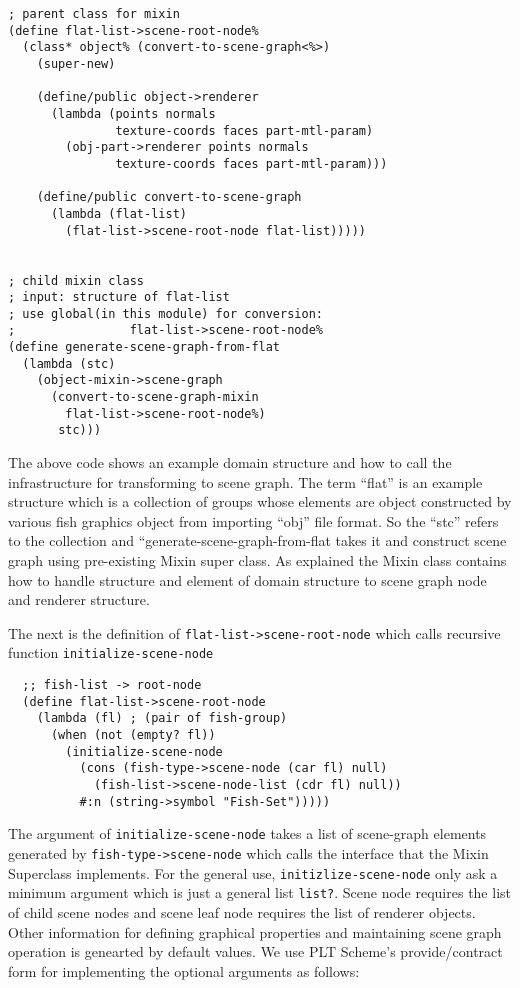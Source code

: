 \documentclass[preprint,nocopyrightspace]{sigplanconf}
\begin{document}
\begin{verbatim}
; parent class for mixin
(define flat-list->scene-root-node%
  (class* object% (convert-to-scene-graph<%>)
    (super-new)
    
    (define/public object->renderer 
      (lambda (points normals 
               texture-coords faces part-mtl-param)
        (obj-part->renderer points normals 
               texture-coords faces part-mtl-param)))
    
    (define/public convert-to-scene-graph 
      (lambda (flat-list)
        (flat-list->scene-root-node flat-list)))))
   

; child mixin class
; input: structure of flat-list
; use global(in this module) for conversion: 
;                flat-list->scene-root-node%
(define generate-scene-graph-from-flat
  (lambda (stc)
    (object-mixin->scene-graph 
      (convert-to-scene-graph-mixin 
        flat-list->scene-root-node%)
       stc)))
\end{verbatim}

The above code shows an example domain structure and how to call the infrastructure for transforming to scene graph. 
The term ``flat'' is an example structure which is a collection of groups whose elements are object constructed by various fish graphics object from importing ``obj'' file format. So the ``stc'' refers to the collection and ``generate-scene-graph-from-flat takes it and construct scene graph using pre-existing Mixin super class. As explained the Mixin class contains how to handle structure and element of domain structure to scene graph node and renderer structure. 

The next is the definition of {\tt flat-list->scene-root-node} which calls recursive function {\tt initialize-scene-node} 
\begin{verbatim}
  ;; fish-list -> root-node
  (define flat-list->scene-root-node
    (lambda (fl) ; (pair of fish-group)
      (when (not (empty? fl))
        (initialize-scene-node
          (cons (fish-type->scene-node (car fl) null)
            (fish-list->scene-node-list (cdr fl) null))
          #:n (string->symbol "Fish-Set")))))
\end{verbatim}
The argument of {\tt initialize-scene-node} takes a list of scene-graph elements generated by {\tt fish-type->scene-node} which calls the interface that the Mixin Superclass implements. 
For the general use, {\tt initizlize-scene-node} only ask a minimum argument which is just a general list {\tt list?}. 
Scene node requires the list of child scene nodes and scene leaf node requires the list of renderer objects.
Other information for defining graphical properties and maintaining scene graph operation is genearted by default values. 
We use PLT Scheme's provide/contract form for implementing the optional arguments as follows:
\end{document}
